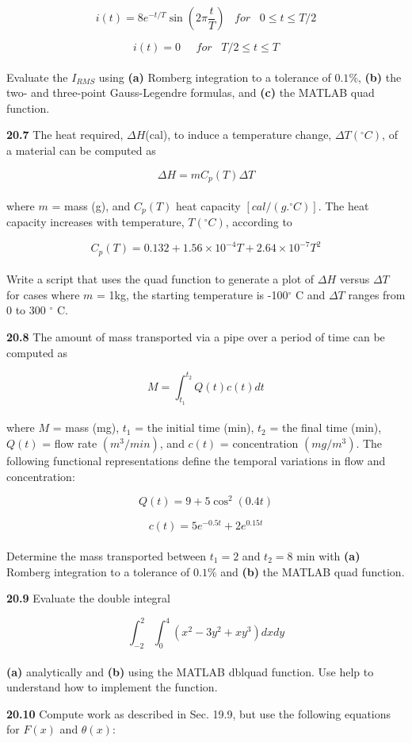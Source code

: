 \documentclass[../main.tex]{subfiles}
\begin{document}
\begin{multicols}{2}
	$$ i(t) = 8e^{-t/T} \sin \left( 2\pi \dfrac{t}{T} \right) \; \; \; for \; \; \; 0 \leq t \leq T/2$$
	
	$$i(t) = 0 \; \; \; \; \; for \; \; \; T/2 \leq t \leq T$$\\
Evaluate the $I_{RMS}$ using \textbf{(a)} Romberg integration to a tolerance of $0.1\% $, \textbf{(b)} the two- and three-point Gauss-Legendre
formulas, and \textbf{(c)} the MATLAB quad function.

\textbf{20.7} The heat required, $\Delta H$(cal), to induce a temperature change, $\Delta T(^{\circ} C)$, of a material can be computed as

	$$\Delta H = mC_{p} (T) \Delta T$$\\
where $m$ = mass (g), and $C_{p}(T)$  heat capacity $[cal/(g .^{\circ}C)]$.
The heat capacity increases with temperature, $T (^{\circ}C)$, 
according to

	$$C_{p} (T) = 0.132 + 1.56 × 10^{-4} T + 2.64 × 10^{-7} T^2$$\\
Write a script that uses the quad function to generate a plot
of $\Delta H$ versus $\Delta T$ for cases where $m$ = 1kg, the starting
temperature is -100$^{\circ}$ C and $\Delta T$ ranges from 0 to 300 $^{\circ}$ C.

\textbf{20.8} The amount of mass transported via a pipe over a period of time can be computed as

	$$M=\int^{t_{2}}_{t_{1}} Q(t)c(t) dt$$\\
where $M$ = mass (mg), $t_{1}$ = the initial time (min), $t_{2}$ = the
final time (min), $Q(t)$ = flow rate $(m^{3}
/min)$, and $c(t)$ =
concentration $(mg/m^{3})$. The following functional representations define the temporal variations in flow and
concentration:

	$$Q(t) = 9 + 5 \cos^{2}(0.4t) $$
	
	$$c(t) = 5e^{-0.5t} + 2e^{0.15t}$$\\
Determine the mass transported between $t_{1} = 2$ and
$t_{2} = 8$ min with \textbf{(a)} Romberg integration to a tolerance of
$0.1\%$ and \textbf{(b)} the MATLAB quad function.

\textbf{20.9} Evaluate the double integral

	$$\int^{2}_{-2} \int^{4}_{0} (x^{2} - 3y^{2} + xy^{3}) dx dy$$\\
\textbf{(a)} analytically and \textbf{(b)} using the MATLAB dblquad 
function. Use help to understand how to implement the
function.

\textbf{20.10} Compute work as described in Sec. 19.9, but use the
following equations for $F(x)$ and $\theta(x)$:


\end{multicols}
\end{document}
